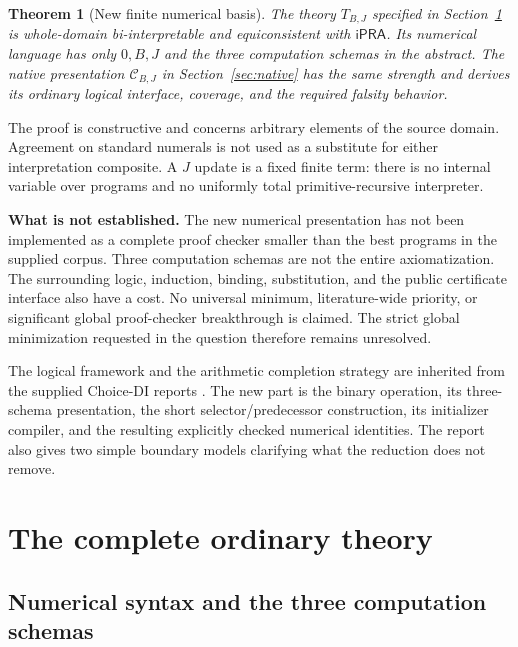 \documentclass[11pt]{article}
\newtheorem{theorem}{Theorem}[section]
\theoremstyle{definition}
\newcommand{\ipra}{\mathsf{iPRA}}
\newcommand{\TB}{T_{B,J}}
\newcommand{\CB}{\mathcal C_{B,J}}
\begin{document}
\begin{theorem}[New finite numerical basis]
\label{thm:main}
The theory $\TB$ specified in Section~\ref{sec:ordinary} is
whole-domain bi-interpretable and equiconsistent with $\ipra$.
Its numerical language has only $0,B,J$ and the three computation schemas
in the abstract. The native presentation $\CB$ in
Section~\ref{sec:native} has the same strength and derives its ordinary
logical interface, coverage, and the required falsity behavior.
\end{theorem}

The proof is constructive and concerns arbitrary elements of the source
domain. Agreement on standard numerals is not used as a substitute for
either interpretation composite. A $J$ update is a fixed finite term:
there is no internal variable over programs and no uniformly total
primitive-recursive interpreter.

\textbf{What is not established.} The new numerical presentation has not
been implemented as a complete proof checker smaller than the best
programs in the supplied corpus. Three computation schemas are not the
entire axiomatization. The surrounding logic, induction, binding,
substitution, and the public certificate interface also have a cost.
No universal minimum, literature-wide priority, or significant global
proof-checker breakthrough is claimed. The strict global minimization
requested in the question therefore remains unresolved.

The logical framework and the arithmetic completion strategy are inherited
from the supplied Choice-DI reports \cite{choice,closure,review}. The new
part is the binary operation, its three-schema presentation, the short
selector/predecessor construction, its initializer compiler, and the
resulting explicitly checked numerical identities. The report also gives
two simple boundary models clarifying what the reduction does not remove.

\section{The complete ordinary theory}
\label{sec:ordinary}

\subsection{Numerical syntax and the three computation schemas}
\end{document}
